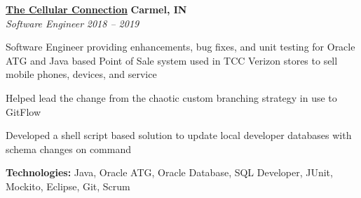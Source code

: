 %
    \headerrow
        {\textbf{\href{https://www.tccrocks.com/}{The Cellular Connection}}}
        {\textbf{Carmel, IN}}
    \\
    \headerrow
        {\emph{Software Engineer}}
        {\emph{2018 -- 2019}}
    \begin{itemize*}
        \item Software Engineer providing enhancements, bug fixes, and unit testing for Oracle ATG and Java
            based Point of Sale system used in TCC Verizon stores to sell mobile phones, devices, and service
        \item Helped lead the change from the chaotic custom branching strategy in use to GitFlow
        \item Developed a shell script based solution to update local developer databases with schema changes on command
    \end{itemize*}

    \hspace{1.0em}
        {\textbf{Technologies:} Java, Oracle ATG, Oracle Database, SQL Developer, JUnit, Mockito, Eclipse, Git, Scrum}
